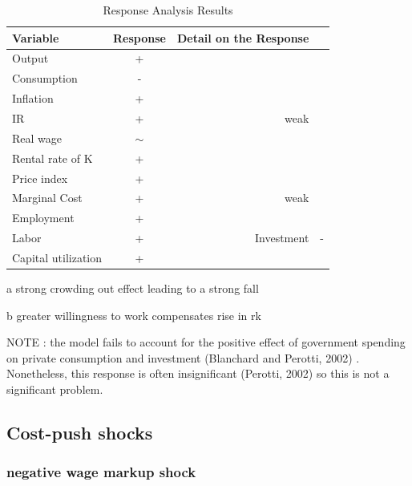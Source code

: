 \documentclass{article}
\begin{document}
\begin{table}[H]    
    \centering  
    \begin{threeparttable}    
    \caption{Response Analysis Results}    
    \label{tab:response_analysis}    
    \begin{tabular}{lcr}    
        \toprule    
        \textbf{Variable} & \textbf{Response} & \textbf{Detail on the Response} \\    
        \midrule    
        Output & + &   \\    
        Consumption  & - & \\ 
        Inflation & + &  \\
        IR & + & weak\\   
        Real wage & $\sim$ & \\  
        Rental rate of K & + & \\
        Price index & + & \\
        Marginal Cost & + & weak  \\
        Employment & + &  \\   
        Labor & + & 
        Investment & - & \\
        Capital utilization & + & \\
        \bottomrule    
    \end{tabular}  
    \begin{tablenotes}  
        \small  
        \item[a] strong crowding out effect leading to a strong fall
        \item[b] greater willingness to work compensates rise in rk
        
    \end{tablenotes}  
    \end{threeparttable}    
\end{table} 
NOTE : the model fails to account for the positive effect of government spending on private consumption and investment (Blanchard and Perotti, 2002) . Nonetheless, this response is often insignificant (Perotti, 2002) so this is not a significant problem. 

\subsection{Cost-push shocks}

\subsubsection{negative wage markup shock}
\end{document}
